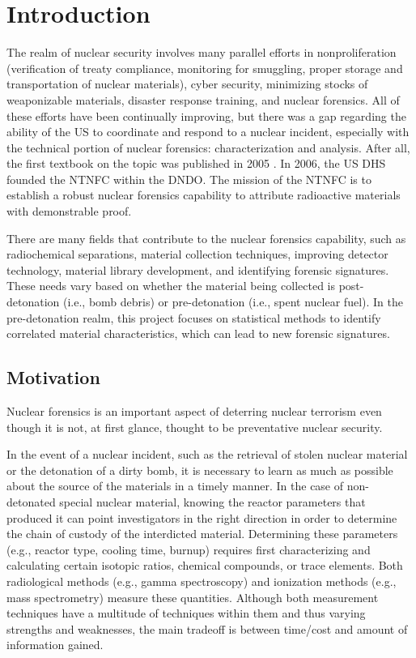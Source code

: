 \chapter{Introduction}
\label{ch:intro}

The realm of nuclear security involves many parallel efforts in
nonproliferation (verification of treaty compliance, monitoring for smuggling,
proper storage and transportation of nuclear materials), cyber security,
minimizing stocks of weaponizable materials, disaster response training, and
nuclear forensics. All of these efforts have been continually improving, but
there was a gap regarding the ability of the \gls{US} to coordinate and respond
to a nuclear incident, especially with the technical portion of nuclear
forensics: characterization and analysis. After all, the first textbook on the
topic was published in 2005 . In 2006, the \gls{US} \gls{DHS}
founded the \gls{NTNFC} within the \gls{DNDO}. The mission of the \gls{NTNFC}
is to establish a robust nuclear forensics capability to attribute radioactive
materials with demonstrable proof.

There are many fields that contribute to the nuclear forensics capability, such
as radiochemical separations, material collection techniques, improving
detector technology, material library development, and identifying forensic
signatures. These needs vary based on whether the material being collected is
post-detonation (i.e., bomb debris) or pre-detonation (i.e., spent nuclear
fuel). In the pre-detonation realm, this project focuses on statistical methods
to identify correlated material characteristics, which can lead to new forensic
signatures. 


\section{Motivation}
\label{sec:motivation}

Nuclear forensics is an important aspect of deterring nuclear terrorism even
though it is not, at first glance, thought to be preventative nuclear security. 


In the event of a nuclear incident, such as the retrieval of stolen nuclear
material or the detonation of a dirty bomb, it is necessary to learn as much as
possible about the source of the materials in a timely manner. In the case of
non-detonated special nuclear material, knowing the reactor parameters that
produced it can point investigators in the right direction in order to
determine the chain of custody of the interdicted material. Determining these
parameters (e.g., reactor type, cooling time, burnup) requires first
characterizing and calculating certain isotopic ratios, chemical compounds, or
trace elements.  Both radiological methods (e.g., gamma spectroscopy) and
ionization methods (e.g., mass spectrometry) measure these quantities. Although
both measurement techniques have a multitude of techniques within them and thus
varying strengths and weaknesses, the main tradeoff is between time/cost and
amount of information gained. 

